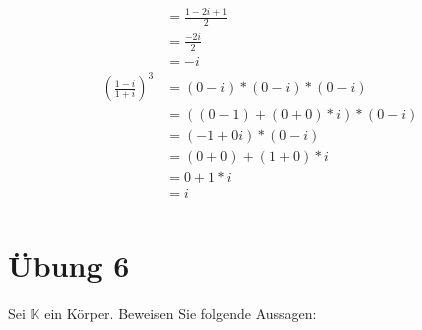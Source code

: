 \documentclass{article}
\begin{document}
\begin{enumerate}
\begin{align*}
                                       &= \frac{1 - 2i + 1}{2} \\
                                       &= \frac{- 2i}{2} \\
                                       &= -i \\
    \left(\frac{1 - i}{1 + i}\right)^3 &= (0 - i) * (0 - i) * (0 - i) \\
                                       &= ((0 - 1) + (0 + 0) * i) * (0 - i) \\
                                       &= (-1 + 0i) * (0 - i) \\
                                       &= (0 + 0) + (1 + 0) * i \\
                                       &= 0 + 1 * i \\
                                       &= i \\
  \end{align*}
\end{enumerate}


\newpage
\section*{Übung 6}

Sei $\mathbb{K}$ ein Körper. Beweisen Sie folgende Aussagen:
\end{document}
